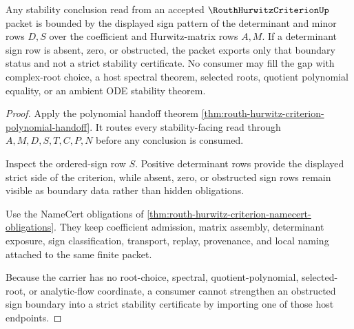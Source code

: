 \begin{theorem}
\label{thm:routh-hurwitz-criterion-stability-boundary}
Any stability conclusion read from an accepted $\RouthHurwitzCriterionUp$ packet is bounded by the displayed sign pattern of the determinant and minor rows $D,S$ over the coefficient and Hurwitz-matrix rows $A,M$. If a determinant sign row is absent, zero, or obstructed, the packet exports only that boundary status and not a strict stability certificate. No consumer may fill the gap with complex-root choice, a host spectral theorem, selected roots, quotient polynomial equality, or an ambient ODE stability theorem.
\end{theorem}
\begin{proof}
Apply the polynomial handoff theorem \autoref{thm:routh-hurwitz-criterion-polynomial-handoff}. It routes every stability-facing read through $A,M,D,S,T,C,P,N$ before any conclusion is consumed.

Inspect the ordered-sign row $S$. Positive determinant rows provide the displayed strict side of the criterion, while absent, zero, or obstructed sign rows remain visible as boundary data rather than hidden obligations.

Use the NameCert obligations of \autoref{thm:routh-hurwitz-criterion-namecert-obligations}. They keep coefficient admission, matrix assembly, determinant exposure, sign classification, transport, replay, provenance, and local naming attached to the same finite packet.

Because the carrier has no root-choice, spectral, quotient-polynomial, selected-root, or analytic-flow coordinate, a consumer cannot strengthen an obstructed sign boundary into a strict stability certificate by importing one of those host endpoints.
\end{proof}


